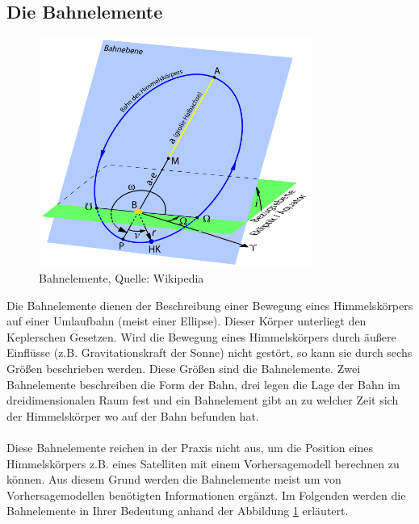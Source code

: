 \subsection{Die Bahnelemente}
\begin{figure}[!htbp]                                                                       %
	\centering                                                                            	%
	\includegraphics[width=0.8\textwidth]{./images/bahnelemente.png}                        %
	\caption[Bahnelemente]{Bahnelemente, Quelle: Wikipedia}                                 %
	\label{fig:bahnelemente}                                                                %
\end{figure}                                                                              	%
Die Bahnelemente dienen der Beschreibung einer Bewegung eines Himmelskörpers auf einer Umlaufbahn (meist einer Ellipse). Dieser Körper unterliegt den Keplerschen Gesetzen. Wird die Bewegung eines Himmelskörpers durch äußere Einflüsse (z.B. Gravitationskraft der Sonne) nicht gestört, so kann sie durch sechs Größen beschrieben werden. Diese Größen sind die Bahnelemente. Zwei Bahnelemente beschreiben die Form der Bahn, drei legen die Lage der Bahn im dreidimensionalen Raum fest und ein Bahnelement gibt an zu welcher Zeit sich der Himmelskörper wo auf der Bahn befunden hat. 
\\\\Diese Bahnelemente reichen in der Praxis nicht aus, um die Position eines Himmelskörpers z.B. eines Satelliten mit einem Vorhersagemodell berechnen zu können. Aus diesem Grund werden die Bahnelemente meist um von Vorhersagemodellen benötigten Informationen ergänzt.       
Im Folgenden werden die Bahnelemente in Ihrer Bedeutung anhand der Abbildung \ref{fig:bahnelemente} erläutert. 

